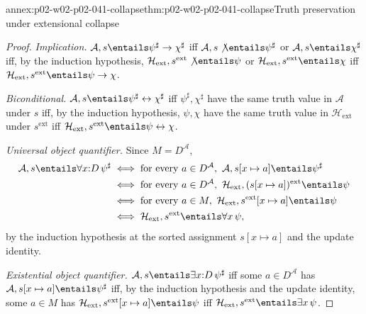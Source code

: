 \begin{annexitem}{annex:p02-w02-p02-041-collapse}{thm:p02-w02-p02-041-collapse}{Truth preservation under extensional collapse}
\begin{proof}
\emph{Implication.}  \(\mathcal A,s\entails\psi^\sharp\to\chi^\sharp\) iff
\(\mathcal A,s\not\entails\psi^\sharp\) or \(\mathcal A,s\entails\chi^\sharp\)
iff, by the induction hypothesis,
\(\mathcal H_{\mathrm{ext}},s^{\mathrm{ext}}\not\entails\psi\) or
\(\mathcal H_{\mathrm{ext}},s^{\mathrm{ext}}\entails\chi\) iff
\(\mathcal H_{\mathrm{ext}},s^{\mathrm{ext}}\entails\psi\to\chi\).

\emph{Biconditional.}
\(\mathcal A,s\entails\psi^\sharp\leftrightarrow\chi^\sharp\) iff
\(\psi^\sharp,\chi^\sharp\) have the same truth value in \(\mathcal A\) under
\(s\) iff, by the induction hypothesis, \(\psi,\chi\) have the same truth
value in \(\mathcal H_{\mathrm{ext}}\) under \(s^{\mathrm{ext}}\) iff
\(\mathcal H_{\mathrm{ext}},s^{\mathrm{ext}}\entails\psi\leftrightarrow\chi\).

\emph{Universal object quantifier.}  Since \(M=D^{\mathcal A}\),
\[
\begin{aligned}
 \mathcal A,s\entails\forall x{:}D\,\psi^\sharp
 &\iff\text{for every }a\in D^{\mathcal A},\
   \mathcal A,s[x\mapsto a]\entails\psi^\sharp\\
 &\iff\text{for every }a\in D^{\mathcal A},\
   \mathcal H_{\mathrm{ext}},(s[x\mapsto a])^{\mathrm{ext}}\entails\psi\\
 &\iff\text{for every }a\in M,\
   \mathcal H_{\mathrm{ext}},s^{\mathrm{ext}}[x\mapsto a]\entails\psi\\
 &\iff\mathcal H_{\mathrm{ext}},s^{\mathrm{ext}}\entails\forall x\,\psi,
\end{aligned}
\]
by the induction hypothesis at the sorted assignment \(s[x\mapsto a]\) and the
update identity.

\emph{Existential object quantifier.}
\(\mathcal A,s\entails\exists x{:}D\,\psi^\sharp\) iff some
\(a\in D^{\mathcal A}\) has \(\mathcal A,s[x\mapsto a]\entails\psi^\sharp\) iff,
by the induction hypothesis and the update identity, some \(a\in M\) has
\(\mathcal H_{\mathrm{ext}},s^{\mathrm{ext}}[x\mapsto a]\entails\psi\) iff
\(\mathcal H_{\mathrm{ext}},s^{\mathrm{ext}}\entails\exists x\,\psi\).


\end{proof}
\end{annexitem}
